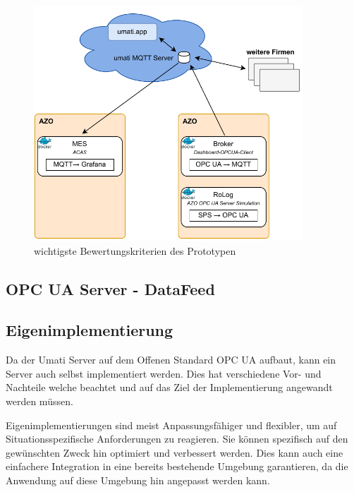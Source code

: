 \documentclass[a4paper, 12pt, oneside]{scrbook}
\begin{document}
		\begin{figure}[H]
			\centering
			\includegraphics[width=0.9\textwidth]{res/umatiAppStruktur.pdf}
			\caption{wichtigste Bewertungskriterien des Prototypen}
			\label{fig:uamti.app}
		\end{figure}
		

		\subsection{OPC UA Server - DataFeed}
		
		
		
		
		\subsection{Eigenimplementierung}
		
		Da der Umati Server auf dem Offenen Standard OPC UA aufbaut, kann ein Server auch selbst implementiert werden. Dies hat verschiedene Vor- und Nachteile welche beachtet und auf das Ziel der Implementierung angewandt werden müssen. 
		
		Eigenimplementierungen sind meist Anpassungsfähiger und flexibler, um auf Situationsspezifische Anforderungen zu reagieren. Sie können spezifisch auf den gewünschten Zweck hin optimiert und verbessert werden. Dies kann auch eine einfachere Integration in eine bereits bestehende Umgebung garantieren, da die Anwendung auf diese Umgebung hin angepasst werden kann.
		
\end{document}
